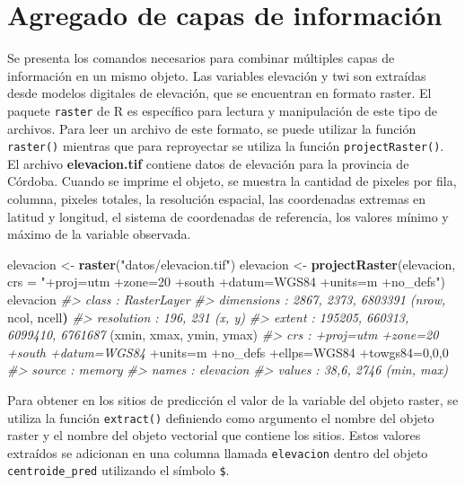 \documentclass[11pt,b5paper,]{krantz}
\newenvironment{Shaded}{}{}
\newcommand{\CommentTok}[1]{\textcolor[rgb]{0.38,0.63,0.69}{\textit{#1}}}
\newcommand{\DataTypeTok}[1]{\textcolor[rgb]{0.56,0.13,0.00}{#1}}
\newcommand{\DecValTok}[1]{\textcolor[rgb]{0.25,0.63,0.44}{#1}}
\newcommand{\ErrorTok}[1]{\textcolor[rgb]{1.00,0.00,0.00}{\textbf{#1}}}
\newcommand{\KeywordTok}[1]{\textcolor[rgb]{0.00,0.44,0.13}{\textbf{#1}}}
\newcommand{\NormalTok}[1]{#1}
\newcommand{\OperatorTok}[1]{\textcolor[rgb]{0.40,0.40,0.40}{#1}}
\newcommand{\StringTok}[1]{\textcolor[rgb]{0.25,0.44,0.63}{#1}}
\begin{document}
\hypertarget{agregado-de-capas-de-informaciuxf3n}{%
\section{Agregado de capas de información}\label{agregado-de-capas-de-informaciuxf3n}}

Se presenta los comandos necesarios para combinar múltiples capas de información en un mismo objeto. Las variables elevación y twi son extraídas desde modelos digitales de elevación, que se encuentran en formato raster. El paquete \texttt{raster} de R es específico para lectura y manipulación de este tipo de archivos. Para leer un archivo de este formato, se puede utilizar la función \texttt{raster()} mientras que para reproyectar se utiliza la función \texttt{projectRaster()}. El archivo \textbf{elevacion.tif} contiene datos de elevación para la provincia de Córdoba. Cuando se imprime el objeto, se muestra la cantidad de pixeles por fila, columna, pixeles totales, la resolución espacial, las coordenadas extremas en latitud y longitud, el sistema de coordenadas de referencia, los valores mínimo y máximo de la variable observada.

\begin{Shaded}
\begin{Highlighting}[]
\NormalTok{elevacion <-}\StringTok{ }\KeywordTok{raster}\NormalTok{(}\StringTok{"datos/elevacion.tif"}\NormalTok{)}
\NormalTok{elevacion <-}
\StringTok{  }\KeywordTok{projectRaster}\NormalTok{(elevacion, }
                \DataTypeTok{crs =} \StringTok{"+proj=utm +zone=20 +south }
\StringTok{                +datum=WGS84 +units=m +no_defs"}\NormalTok{)}
\NormalTok{elevacion}
\CommentTok{#> class : RasterLayer}
\CommentTok{#> dimensions : 2867, 2373, 6803391 (nrow,}
\NormalTok{ncol, ncell}\ErrorTok{)}
\CommentTok{#> resolution : 196, 231 (x, y)}
\CommentTok{#> extent : 195205, 660313, 6099410, 6761687}
\NormalTok{(xmin, xmax, ymin, ymax)}
\CommentTok{#> crs : +proj=utm +zone=20 +south +datum=WGS84}
\OperatorTok{+}\NormalTok{units=m }\OperatorTok{+}\NormalTok{no_defs }\OperatorTok{+}\NormalTok{ellps=WGS84 }\OperatorTok{+}\NormalTok{towgs84=}\DecValTok{0}\NormalTok{,}\DecValTok{0}\NormalTok{,}\DecValTok{0}
\CommentTok{#> source : memory}
\CommentTok{#> names : elevacion}
\CommentTok{#> values : 38,6, 2746 (min, max)}
\end{Highlighting}
\end{Shaded}

Para obtener en los sitios de predicción el valor de la variable del objeto raster, se utiliza la función \texttt{extract()} definiendo como argumento el nombre del objeto raster y el nombre del objeto vectorial que contiene los sitios. Estos valores extraídos se adicionan en una columna llamada \texttt{elevacion} dentro del objeto \texttt{centroide\_pred} utilizando el símbolo \texttt{\$}.
\end{document}

